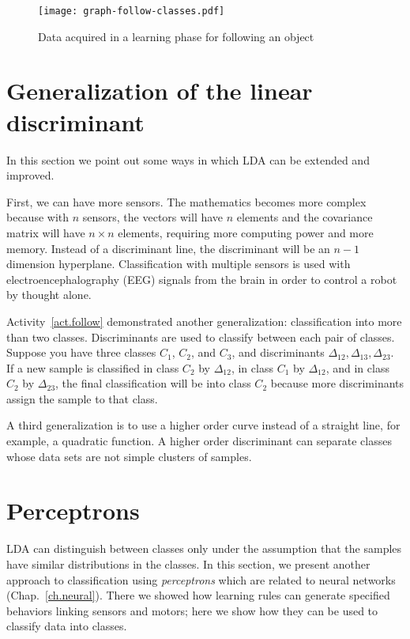 \begin{figure}
\begin{center}
\texttt{[image: graph-follow-classes.pdf]}
\end{center}
\caption{Data acquired in a learning phase for following an object}\label{fig.machlearnfollow}
\end{figure}

\section{Generalization of the linear discriminant}\label{s.gen-lda}

In this section we point out some ways in which LDA can be extended and improved.

First, we can have more sensors. The mathematics becomes more complex because with $n$ sensors, the vectors will have $n$ elements and the covariance matrix will have $n\times n$ elements, requiring more computing power and more memory. Instead of a discriminant line, the discriminant will be an $n-1$ dimension hyperplane. Classification with multiple sensors is used with electroencephalography (EEG) signals from the brain in order to control a robot by thought alone.

Activity~\ref{act.follow} demonstrated another generalization: classification into more than two classes. Discriminants are used to classify between each pair of classes. Suppose you have three classes $C_1$, $C_2$, and $C_3$, and discriminants $\Delta_{12}, \Delta_{13}, \Delta_{23}$. If a new sample is classified in class $C_2$ by $\Delta_{12}$, in class $C_1$ by $\Delta_{12}$, and in class $C_2$ by $\Delta_{23}$, the final classification will be into class $C_2$ because more discriminants assign the sample to that class.

A third generalization is to use a higher order curve instead of a straight line, for example, a quadratic function. A higher order discriminant can separate classes whose data sets are not simple clusters of samples.

\section{Perceptrons}\label{s.perceptrons}


LDA can distinguish between classes only under the assumption that the samples have similar distributions in the classes. In this section, we present another approach to classification using \emph{perceptrons} which are related to neural networks (Chap.~\ref{ch.neural}). There we showed how learning rules can generate specified behaviors linking sensors and motors; here we show how they can be used to classify data into classes.

